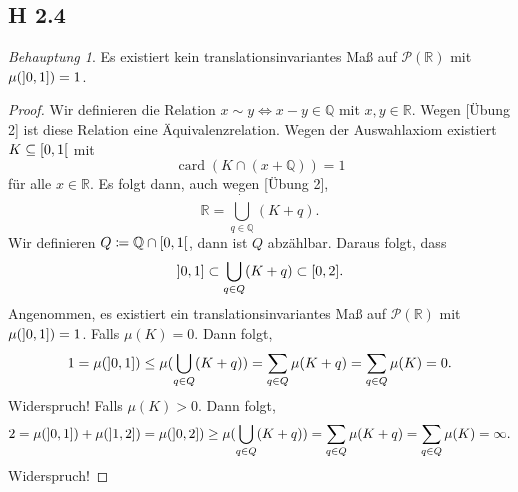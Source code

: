 \documentclass[draft,a5paper]{article}
\theoremstyle{remark}
\newtheorem*{Behauptung}{Behauptung}
\DeclareMathOperator{\card}{card}
\providecommand{\cardi}[1]{\card\left(#1\right)}
\begin{document}
\subsection{H 2.4}
\begin{Behauptung}
  Es existiert kein translationsinvariantes Maß auf \(\mathcal{P}(\mathbb{R})\) mit
  \(\mu(\linterval{0}{1}) = 1\).
\end{Behauptung}
\begin{proof}
  Wir definieren die Relation
  \(x \sim y \Leftrightarrow x - y \in \mathbb{Q}\) mit
  \(x, y \in \mathbb{R}\).  Wegen [Übung 2] ist diese Relation eine
  Äquivalenzrelation.  Wegen der Auswahlaxiom existiert
  \(K \subseteq \rinterval{0}{1}\) mit
  \[\cardi{K \cap (x+\mathbb{Q})} = 1\] für alle \(x \in \mathbb{R}\).   Es folgt dann, auch wegen [Übung 2],
  \[\mathbb{R} = \dot{\bigcup_{q \in \mathbb{Q}}} (K+q).\]
  Wir definieren \(Q \coloneq \mathbb{Q} \cap \rinterval{0}{1} \), dann ist \(Q\) abzählbar. Daraus folgt, dass
  \[\linterval{0}{1} \subset \bigcup_{q \in Q} (K+q) \subset
    \interval{0}{2}.\]
  Angenommen, es existiert ein translationsinvariantes Maß auf \(\mathcal{P}(\mathbb{R})\) mit
  \(\mu(\linterval{0}{1}) = 1\).  Falls \(\mu(K) = 0\).  Dann folgt,
  \[1 = \mu(\linterval{0}{1}) \le \mu(\bigcup_{q \in Q} (K+q)) = \sum_{q \in Q}\mu(K+q)
    = \sum_{q \in Q}\mu(K) = 0.\]
  Widerspruch!  Falls \(\mu(K) > 0\).  Dann folgt,
  \[2 = \mu(\linterval{0}{1}) + {\mu(\linterval{1}{2})}
     = \mu(\linterval{0}{2}) \ge \mu(\bigcup_{q \in Q} (K+q)) = \sum_{q \in Q}\mu(K+q)
     = \sum_{q \in Q}\mu(K) = \infty. \]
   Widerspruch!
 \end{proof}
\end{document}
